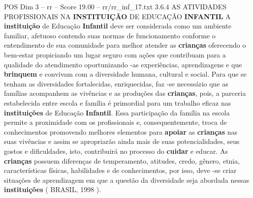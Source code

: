 \begin{textsample}{POS Dim 3 – rr – Score 19.00 – rr/rr\_inf\_17.txt}  \label{ex:f3_pos_224}
3.6.4 AS ATIVIDADES PROFISSIONAIS NA \textbf{INSTITUIÇÃO} DE EDUCAÇÃO \textbf{INFANTIL} A \textbf{instituição} de Educação \textbf{Infantil} deve ser considerada como um ambiente familiar, afetuoso contendo suas normas de funcionamento conforme o entendimento de sua comunidade para melhor atender as \textbf{crianças} oferecendo o bem-estar propiciando um lugar seguro com ações que contribuam para a qualidade do atendimento oportunizando -as experiências, aprendizagens e que \textbf{brinquem} e convivam com a diversidade humana, cultural e social.
Para que se tenham as diversidades fortalecidas, enriquecidas, faz -se necessário que as famílias acompanhem as vivências e as produções das \textbf{crianças}, pois, a parceria estabelecida entre escola e família é primordial para um trabalho eficaz nas \textbf{instituições} de Educação \textbf{Infantil}.
Essa participação da família na escola permite a proximidade com os profissionais e, consequentemente, troca de conhecimentos promovendo melhores elementos para \textbf{apoiar} as \textbf{crianças} nas suas vivências e assim se apropriarão ainda mais de suas potencialidades, seus gostos e dificuldades, isto, contribuirá no processo do \textbf{cuidar} e educar.
As \textbf{crianças} possuem diferenças de temperamento, atitudes, credo, gênero, etnia, características físicas, habilidades e de conhecimentos, por isso, deve -se criar situações de aprendizagem em que a questão da diversidade seja abordada nessas \textbf{instituições} ( BRASIL, 1998 ).

\end{textsample}

